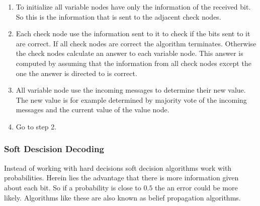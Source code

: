 \begin{enumerate}
	\item To initialize all variable nodes have only the information of the received bit. So this is the information that is sent to the adjacent check nodes.
	\item Each check node use the information sent to it to check if the bits sent to it are correct. If all check nodes are correct the algorithm terminates. Otherwise the check nodes calculate an answer to each variable node. This answer is computed by assuming that the information from all check nodes except the one the answer is directed to is correct.
	\item All variable node use the incoming messages to determine their new value. The new value is for example determined by majority vote of the incoming messages and the current value of the value node.
	\item Go to step 2.
\end{enumerate}

\subsubsection{Soft Descision Decoding}
Instead of working with hard decisions soft decision algorithms work with probabilities. Herein lies the advantage that there is more information given about each bit. So if a probability is close to $0.5$ the an error could be more likely. Algorithms like these are also known as belief propagation algorithms.

